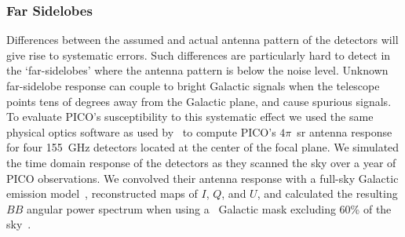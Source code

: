 \documentclass[PICOReport.tex]{subfiles}
\begin{document}




\subsubsection{Far Sidelobes}
\label{sec:fsl}

Differences between the assumed and actual antenna pattern of the detectors will give rise to systematic errors. Such differences are particularly hard to detect in the `far-sidelobes' where the antenna pattern is below the noise level. Unknown far-sidelobe response can couple to bright Galactic signals when the telescope points tens of degrees away from the Galactic plane, and cause spurious signals. To evaluate PICO's susceptibility to this systematic effect we used the same physical optics software as used by \planck\ to compute PICO's $4\pi$~sr antenna response for four 155~GHz detectors located at the center of the focal plane. We simulated the time domain response of the detectors as they scanned the sky over a year of PICO observations. We convolved their antenna response with a full-sky Galactic emission model~\citep{thorne2018_pysm}, reconstructed maps of $I$, $Q$, and $U$, and calculated the resulting $BB$ angular power spectrum when using a \planck\ Galactic mask excluding 60\% of the sky~\citep{planck_2013_xv}. 
\end{document}
